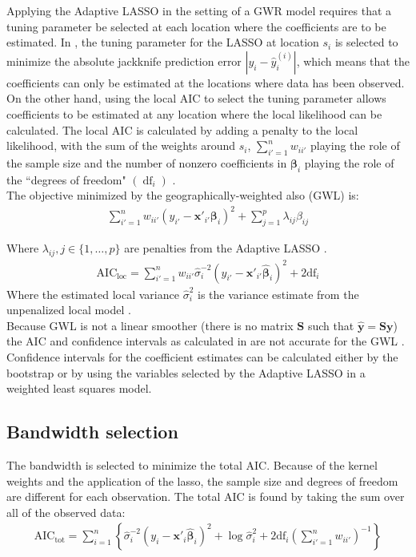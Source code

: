 \documentclass[authoryear, review, 11pt]{elsarticle}
\DeclareMathOperator*{\df}{\mbox{df}}
\begin{document}
	Applying the Adaptive LASSO in the setting of a GWR model requires that a tuning parameter be selected at each location where the coefficients are to be estimated. In \cite{Wheeler:2009}, the tuning parameter for the LASSO at location $s_i$ is selected to minimize the absolute jackknife prediction error $|y_i - \hat{y}_i^{(i)}|$, which means that the coefficients can only be estimated at the locations where data has been observed. On the other hand, using the local AIC to select the tuning parameter allows coefficients to be estimated at any location where the local likelihood can be calculated. The local AIC is calculated by adding a penalty to the local likelihood, with the sum of the weights around $s_i$, $\sum_{i'=1}^n w_{ii'}$ playing the role of the sample size and the number of nonzero coefficients in $\bm{\beta}_i$ playing the role of the ``degrees of freedom" $\left( \df_i \right)$ \citep{Zou:2007}.\\


	The objective minimized by the geographically-weighted also (GWL) is:	
	\begin{eqnarray}
		\sum_{i'=1}^n w_{ii'} \left(y_{i'} - \bm{x}'_{i'} \bm{\beta}_i \right)^2 + \sum_{j=1}^p \lambda_{ij} \beta_{ij}
	\end{eqnarray}
	
	Where $\lambda_{ij}, j \in \{1, \dots, p\}$ are penalties from the Adaptive LASSO \citep{Zou:2006}.
	\begin{eqnarray}
		\mbox{AIC}_{\mbox{loc}} = \sum_{i'=1}^n w_{ii'} \hat{\sigma}_i^{-2} \left( y_{i'} - \bm{x}'_{i'} \hat{\bm{\beta}}_i \right)^2 + 2 \mbox{df}_i
	\end{eqnarray}	
	Where the estimated local variance $\hat{\sigma}_i^2$ is the variance estimate from the unpenalized local model \citep{Zou:2007}.\\

	Because GWL is not a linear smoother (there is no matrix $\bm{S}$ such that $\hat{\bm{y}} = \bm{S} \bm{y}$) the AIC and confidence intervals as calculated in \cite{Fotheringham:2002} are not accurate for the GWL \citep{Zou:2006}. Confidence intervals for the coefficient estimates can be calculated either by the bootstrap \citep{Efron:1986} or by using the variables selected by the Adaptive LASSO in a weighted least squares model.\\

	\subsection{Bandwidth selection}
		The bandwidth is selected to minimize the total AIC. Because of the kernel weights and the application of the lasso, the sample size and degrees of freedom are different for each observation. The total AIC is found by taking the sum over all of the observed data:		
		\begin{eqnarray}
			\mbox{AIC}_{\mbox{tot}} = \sum_{i=1}^n \left\{ \hat{\sigma}_i^{-2} \left( y_i - \bm{x}'_i \hat{\bm{\beta}}_i \right)^2 + \log \hat{\sigma}_i^2 + 2 \mbox{df}_i \left(\sum_{i'=1}^n w_{ii'} \right)^{-1} \right\}
		\end{eqnarray}
			
\end{document}
